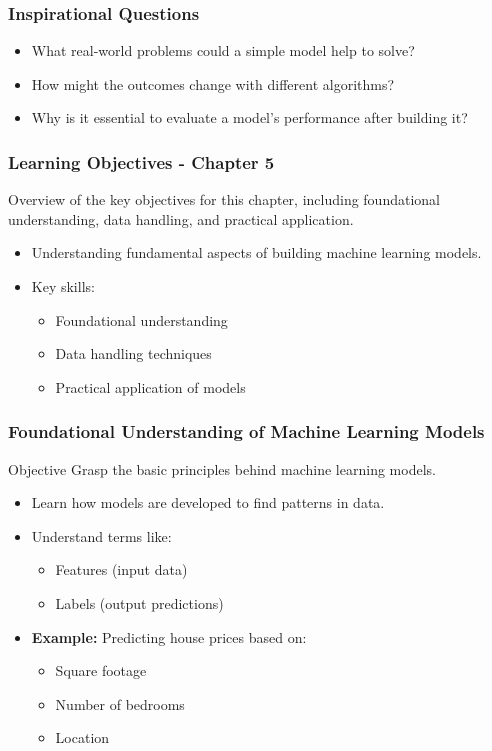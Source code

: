 \documentclass[aspectratio=169]{beamer}
\begin{document}
\begin{frame}[fragile]
    \frametitle{Inspirational Questions}
    \begin{itemize}
        \item What real-world problems could a simple model help to solve?
        \item How might the outcomes change with different algorithms?
        \item Why is it essential to evaluate a model’s performance after building it?
    \end{itemize}
\end{frame}

\begin{frame}[fragile]
    \frametitle{Learning Objectives - Chapter 5}
    Overview of the key objectives for this chapter, including foundational understanding, data handling, and practical application.

    \begin{itemize}
        \item Understanding fundamental aspects of building machine learning models.
        \item Key skills:
        \begin{itemize}
            \item Foundational understanding
            \item Data handling techniques
            \item Practical application of models
        \end{itemize}
    \end{itemize}
\end{frame}

\begin{frame}[fragile]
    \frametitle{Foundational Understanding of Machine Learning Models}
    \begin{block}{Objective}
        Grasp the basic principles behind machine learning models.
    \end{block}
    \begin{itemize}
        \item Learn how models are developed to find patterns in data.
        \item Understand terms like:
        \begin{itemize}
            \item Features (input data)
            \item Labels (output predictions)
        \end{itemize}
        \item \textbf{Example:} Predicting house prices based on:
        \begin{itemize}
            \item Square footage
            \item Number of bedrooms
            \item Location
        \end{itemize}
    \end{itemize}
\end{frame}
\end{document}
